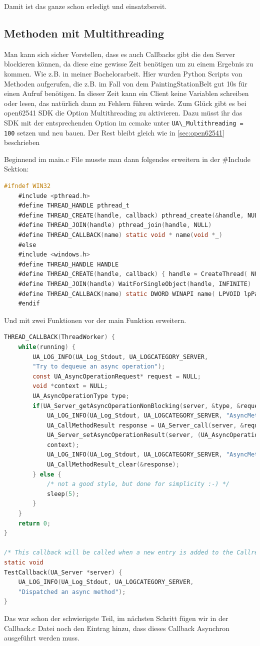 Damit ist das ganze schon erledigt und einsatzbereit.
\subsection{Methoden mit Multithreading}
Man kann sich sicher Vorstellen, dass es auch Callbacks gibt die den Server blockieren können, da diese eine gewisse Zeit benötigen um zu einem Ergebnis zu kommen.
Wie z.B. in meiner Bachelorarbeit. Hier wurden Python Scripts von Methoden aufgerufen, die z.B. im Fall von dem PaintingStationBelt gut 10s für einen Aufruf benötigen. In dieser Zeit kann ein Client keine Variablen schreiben oder lesen, das natürlich dann zu Fehlern führen würde. Zum Glück gibt es bei open62541 SDK die Option Multithreading zu aktivieren. Dazu müsst ihr das SDK mit der entsprechenden Option im ccmake unter \lstinline|UA\_Multithreading = 100| setzen und neu bauen.  Der Rest bleibt gleich wie in \autoref{sec:open62541} beschrieben

Beginnend im main.c File musste man dann folgendes erweitern in der \#Include Sektion:
\begin{lstlisting}[language=C]
	#ifndef WIN32
	#include <pthread.h>
	#define THREAD_HANDLE pthread_t
	#define THREAD_CREATE(handle, callback) pthread_create(&handle, NULL, callback, NULL)
	#define THREAD_JOIN(handle) pthread_join(handle, NULL)
	#define THREAD_CALLBACK(name) static void * name(void *_)
	#else
	#include <windows.h>
	#define THREAD_HANDLE HANDLE
	#define THREAD_CREATE(handle, callback) { handle = CreateThread( NULL, 0, callback, NULL, 0, NULL); }
	#define THREAD_JOIN(handle) WaitForSingleObject(handle, INFINITE)
	#define THREAD_CALLBACK(name) static DWORD WINAPI name( LPVOID lpParam )
	#endif
\end{lstlisting}
Und mit zwei Funktionen vor der main Funktion erweitern.

\begin{lstlisting}[language=C]
THREAD_CALLBACK(ThreadWorker) {
	while(running) {
		UA_LOG_INFO(UA_Log_Stdout, UA_LOGCATEGORY_SERVER,
		"Try to dequeue an async operation");
		const UA_AsyncOperationRequest* request = NULL;
		void *context = NULL;
		UA_AsyncOperationType type;
		if(UA_Server_getAsyncOperationNonBlocking(server, &type, &request, &context, NULL) == true) {
			UA_LOG_INFO(UA_Log_Stdout, UA_LOGCATEGORY_SERVER, "AsyncMethod_Testing: Got entry: OKAY");
			UA_CallMethodResult response = UA_Server_call(server, &request->callMethodRequest);
			UA_Server_setAsyncOperationResult(server, (UA_AsyncOperationResponse*)&response,
			context);
			UA_LOG_INFO(UA_Log_Stdout, UA_LOGCATEGORY_SERVER, "AsyncMethod_Testing: Call done: OKAY");
			UA_CallMethodResult_clear(&response);
		} else {
			/* not a good style, but done for simplicity :-) */
			sleep(5);
		}
	}
	return 0;
}

/* This callback will be called when a new entry is added to the Callrequest queue */
static void
TestCallback(UA_Server *server) {
	UA_LOG_INFO(UA_Log_Stdout, UA_LOGCATEGORY_SERVER,
	"Dispatched an async method");
}
\end{lstlisting}
Das war schon der schwierigste Teil, im nächsten Schritt fügen wir in der Callback.c Datei noch den Eintrag hinzu, dass dieses Callback Asynchron ausgeführt werden muss.

